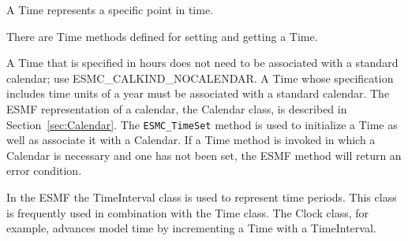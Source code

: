 \label{sec:Time}

A Time represents a specific point in time.

There are Time methods defined for setting and getting a Time.

A Time that is specified in hours does not need to be associated with a 
standard calendar; use ESMC\_CALKIND\_NOCALENDAR.  A Time whose specification 
includes time units of a year must be associated with a standard calendar. 
The ESMF representation of a calendar, the Calendar class, is described in 
Section~\ref{sec:Calendar}.  The {\tt ESMC\_TimeSet} method is used to 
initialize a Time as well as associate it with a Calendar.  If a Time method 
is invoked in which a Calendar is necessary and one has not been set, the 
ESMF method will return an error condition.

In the ESMF the TimeInterval class is used to represent time periods. 
This class is frequently used in combination with the Time class. 
The Clock class, for example, advances model time by incrementing a 
Time with a TimeInterval. 
